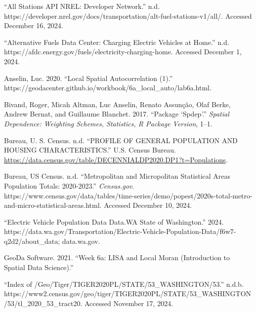 \documentclass[
  letterpaper,
  DIV=11,
  numbers=noendperiod]{scrartcl}
\newlength{\cslhangindent}
\newenvironment{CSLReferences}[2] %
 {\begin{list}{}{%
  \setlength{\itemindent}{0pt}
  \setlength{\leftmargin}{0pt}
  \setlength{\parsep}{0pt}
  \ifodd #1
   \setlength{\leftmargin}{\cslhangindent}
   \setlength{\itemindent}{-1\cslhangindent}
  \fi
  \setlength{\itemsep}{#2\baselineskip}}}
 {\end{list}}
\begin{document}
\label{refs}
\begin{CSLReferences}{1}{0}
{``All {Stations API} {\textbar} {NREL}: {Developer Network}.''} n.d.
https://developer.nrel.gov/docs/transportation/alt-fuel-stations-v1/all/.
Accessed December 16, 2024.

{``Alternative {Fuels Data Center}: {Charging Electric Vehicles} at
{Home}.''} n.d. https://afdc.energy.gov/fuels/electricity-charging-home.
Accessed December 1, 2024.

Anselin, Luc. 2020. {``Local {Spatial Autocorrelation} (1).''}
https://geodacenter.github.io/workbook/6a\_local\_auto/lab6a.html.

Bivand, Roger, Micah Altman, Luc Anselin, Renato Assunção, Olaf Berke,
Andrew Bernat, and Guillaume Blanchet. 2017. {``Package {`Spdep'}.''}
\emph{Spatial Dependence: Weighting Schemes, Statistics, R Package
Version}, 1--1.

Bureau, U. S. Census. n.d. {``PROFILE OF GENERAL POPULATION AND HOUSING
CHARACTERISTICS.''} U.S. Census Bureau.
\url{https://data.census.gov/table/DECENNIALDP2020.DP1?t=Populations}.

Bureau, US Census. n.d. {``Metropolitan and {Micropolitan Statistical
Areas Population Totals}: 2020-2023.''} \emph{Census.gov}.
https://www.census.gov/data/tables/time-series/demo/popest/2020s-total-metro-and-micro-statistical-areas.html.
Accessed December 10, 2024.

{``Electric {Vehicle Population Data} {\textbar} {Data}.{WA} {\textbar}
{State} of {Washington}.''} 2024.
https://data.wa.gov/Transportation/Electric-Vehicle-Population-Data/f6w7-q2d2/about\_data;
data.wa.gov.

GeoDa Software. 2021. {``Week 6a: {LISA} and Local Moran ({Introduction}
to {Spatial Data Science}).''}

{``Index of /Geo/Tiger/{TIGER2020PL}/{STATE}/53\_{WASHINGTON}/53.''}
n.d.b.
https://www2.census.gov/geo/tiger/TIGER2020PL/STATE/53\_WASHINGTON/53/tl\_2020\_53\_tract20.
Accessed November 17, 2024.


\end{CSLReferences}
\end{document}
